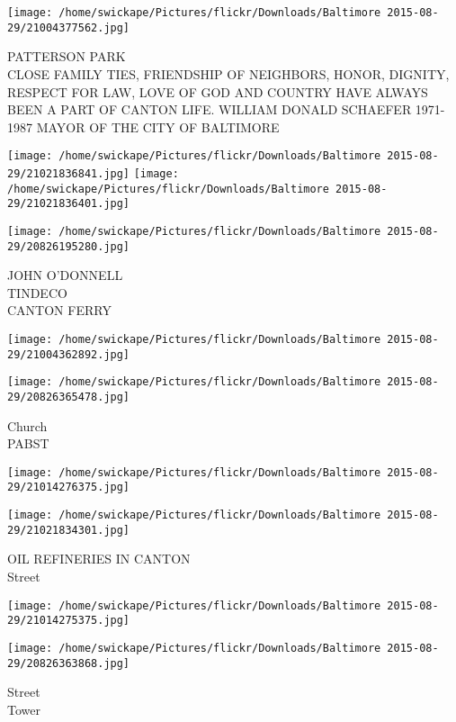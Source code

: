 \documentclass[10pt,letterpaper]{article}
\begin{document}
\vspace{0.25in}
\texttt{[image: /home/swickape/Pictures/flickr/Downloads/Baltimore 2015-08-29/21004377562.jpg]}

PATTERSON PARK\\
CLOSE FAMILY TIES, FRIENDSHIP OF NEIGHBORS, HONOR, DIGNITY, RESPECT FOR LAW, LOVE OF GOD AND COUNTRY HAVE ALWAYS BEEN A PART OF CANTON LIFE.  WILLIAM DONALD SCHAEFER 1971{-}1987 MAYOR OF THE CITY OF BALTIMORE
\pagebreak

\texttt{[image: /home/swickape/Pictures/flickr/Downloads/Baltimore 2015-08-29/21021836841.jpg]}
\texttt{[image: /home/swickape/Pictures/flickr/Downloads/Baltimore 2015-08-29/21021836401.jpg]}

\vspace{0.25in}
\texttt{[image: /home/swickape/Pictures/flickr/Downloads/Baltimore 2015-08-29/20826195280.jpg]}

JOHN O'DONNELL\\
TINDECO\\
CANTON FERRY
\pagebreak

\texttt{[image: /home/swickape/Pictures/flickr/Downloads/Baltimore 2015-08-29/21004362892.jpg]}

\vspace{0.25in}
\texttt{[image: /home/swickape/Pictures/flickr/Downloads/Baltimore 2015-08-29/20826365478.jpg]}

Church\\
PABST
\pagebreak

\texttt{[image: /home/swickape/Pictures/flickr/Downloads/Baltimore 2015-08-29/21014276375.jpg]}

\vspace{0.25in}
\texttt{[image: /home/swickape/Pictures/flickr/Downloads/Baltimore 2015-08-29/21021834301.jpg]}

OIL REFINERIES IN CANTON\\
Street
\pagebreak

\texttt{[image: /home/swickape/Pictures/flickr/Downloads/Baltimore 2015-08-29/21014275375.jpg]}

\vspace{0.25in}
\texttt{[image: /home/swickape/Pictures/flickr/Downloads/Baltimore 2015-08-29/20826363868.jpg]}

Street\\
Tower
\pagebreak
\end{document}
